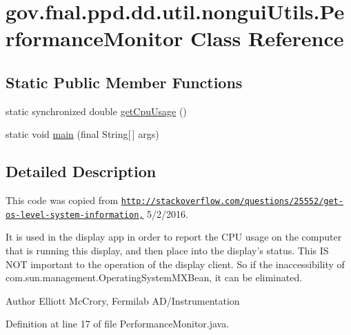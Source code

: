 \hypertarget{classgov_1_1fnal_1_1ppd_1_1dd_1_1util_1_1nonguiUtils_1_1PerformanceMonitor}{\section{gov.\-fnal.\-ppd.\-dd.\-util.\-nongui\-Utils.\-Performance\-Monitor Class Reference}
\label{classgov_1_1fnal_1_1ppd_1_1dd_1_1util_1_1nonguiUtils_1_1PerformanceMonitor}
}
\subsection*{Static Public Member Functions}
\begin{DoxyCompactItemize}
\item 
static synchronized double \hyperlink{classgov_1_1fnal_1_1ppd_1_1dd_1_1util_1_1nonguiUtils_1_1PerformanceMonitor_a461715794dca1f1139cf3f332cb95577}{get\-Cpu\-Usage} ()
\item 
static void \hyperlink{classgov_1_1fnal_1_1ppd_1_1dd_1_1util_1_1nonguiUtils_1_1PerformanceMonitor_abdccedb86427a4445b459cbebd4c6424}{main} (final String\mbox{[}$\,$\mbox{]} args)
\end{DoxyCompactItemize}


\subsection{Detailed Description}
This code was copied from \href{http://stackoverflow.com/questions/25552/get-os-level-system-information,}{\tt http\-://stackoverflow.\-com/questions/25552/get-\/os-\/level-\/system-\/information,} 5/2/2016.

It is used in the display app in order to report the C\-P\-U usage on the computer that is running this display, and then place into the display's status. This I\-S N\-O\-T important to the operation of the display client. So if the inaccessibility of com.\-sun.\-management.\-Operating\-System\-M\-X\-Bean, it can be eliminated.

\begin{DoxyAuthor}{Author}
Elliott Mc\-Crory, Fermilab A\-D/\-Instrumentation 
\end{DoxyAuthor}


Definition at line 17 of file Performance\-Monitor.\-java.



